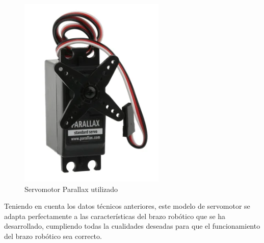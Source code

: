 \begin{figure}[H]
    \centering 
    \includegraphics[width=.35\linewidth]{pictures/ServoParallax.PNG}
    \caption{Servomotor Parallax utilizado \cite{rs-online90000005ServomotorParallax}}
    \label{fig:}
\end{figure}

Teniendo en cuenta los datos técnicos anteriores, este modelo de servomotor se adapta perfectamente a las características del brazo robótico que se ha desarrollado, cumpliendo todas la cualidades deseadas para que el funcionamiento del brazo robótico sea correcto.